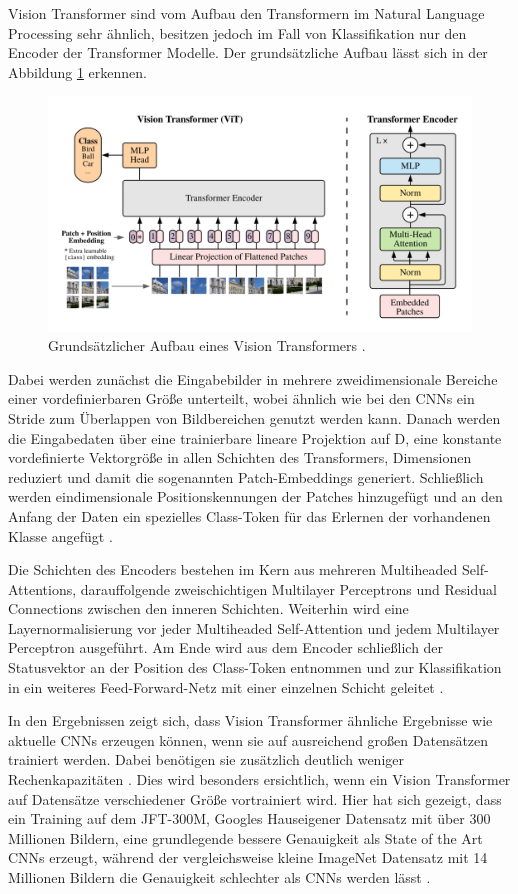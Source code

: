 \documentclass[twoside,a4paper]{IEEEtran}
\begin{document}
Vision Transformer sind vom Aufbau den Transformern im Natural Language Processing sehr ähnlich, besitzen jedoch im Fall von Klassifikation nur den Encoder der Transformer Modelle. Der grundsätzliche Aufbau lässt sich in der Abbildung \ref{vitimg} erkennen.

\begin{figure}[!htb]
	\includegraphics[width=\columnwidth]{vitimg}
	\caption{Grundsätzlicher Aufbau eines Vision Transformers \cite[S.3]{VIT}.}
	\label{vitimg}
\end{figure}

Dabei werden zunächst die Eingabebilder in mehrere zweidimensionale Bereiche einer vordefinierbaren Größe unterteilt, wobei ähnlich wie bei den CNNs ein Stride zum Überlappen von Bildbereichen genutzt werden kann. Danach werden die Eingabedaten über eine trainierbare lineare Projektion auf D, eine konstante vordefinierte Vektorgröße in allen Schichten des Transformers, Dimensionen reduziert und damit die sogenannten Patch-Embeddings generiert. Schließlich werden eindimensionale Positionskennungen der Patches hinzugefügt und an den Anfang der Daten ein spezielles Class-Token für das Erlernen der vorhandenen Klasse angefügt  \cite[S.3]{VIT}. 

Die Schichten des Encoders bestehen im Kern aus mehreren Multiheaded Self-Attentions, darauffolgende zweischichtigen Multilayer Perceptrons und Residual Connections zwischen den inneren Schichten. Weiterhin wird eine Layernormalisierung vor jeder Multiheaded Self-Attention und jedem Multilayer Perceptron ausgeführt. Am Ende wird aus dem Encoder schließlich der Statusvektor an der Position des Class-Token entnommen und zur Klassifikation in ein weiteres Feed-Forward-Netz mit einer einzelnen Schicht geleitet \cite[S.3-4]{VIT}. 

In den Ergebnissen zeigt sich, dass Vision Transformer ähnliche Ergebnisse wie aktuelle CNNs erzeugen können, wenn sie auf ausreichend großen Datensätzen trainiert werden. Dabei benötigen sie zusätzlich deutlich weniger Rechenkapazitäten \cite[S.5]{VIT}. Dies wird besonders ersichtlich, wenn ein Vision Transformer auf Datensätze verschiedener Größe vortrainiert wird. Hier hat sich gezeigt, dass ein Training auf dem JFT-300M, Googles Hauseigener Datensatz mit über 300 Millionen Bildern, eine grundlegende bessere Genauigkeit als State of the Art CNNs erzeugt, während der vergleichsweise kleine ImageNet Datensatz mit 14 Millionen Bildern \cite{IMAGENET} die Genauigkeit schlechter als CNNs werden lässt \cite{JFT}.
\end{document}
